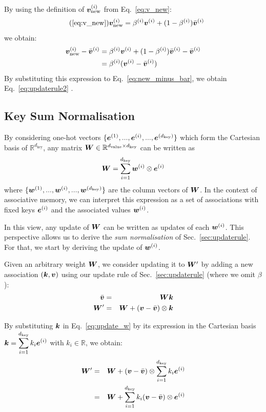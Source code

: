 \documentclass{article}
\theoremstyle{definition}
\begin{document}
By using the definition of ${\bm{v}}^{(i)}_\text{new}$ from Eq.~\ref{eq:v_new}:
\begin{align}
\tag{\ref{eq:v_new}}
\vv^{(i)}_\text{new} &= \beta^{(i)} \vv^{(i)} +(1-\beta^{(i)}) \bar{\vv}^{(i)}
\end{align}
we obtain:
\begin{align}
{\bm{v}}^{(i)}_\text{new} - \bar{{\bm{v}}}^{(i)} &= \beta^{(i)} {\bm{v}}^{(i)} +(1-\beta^{(i)}) \bar{{\bm{v}}}^{(i)} - \bar{{\bm{v}}}^{(i)} \\
 & =  \beta^{(i)} ({\bm{v}}^{(i)} - \bar{{\bm{v}}}^{(i)} )
\end{align}
By substituting this expression to Eq.~\ref{eq:new_minus_bar}, we obtain Eq.~\ref{eq:updaterule2} \qedsymbol.

\subsection{Key Sum Normalisation}
\label{app:norm}

By considering one-hot vectors $\{{\bm{e}}^{(1)}, ..., {\bm{e}}^{(i)}, ..., {\bm{e}}^{(d_\text{key})}\}$
which form the Cartesian basis of $\mathbb{R}^{d_\text{key}}$,
any matrix ${\bm{W}} \in \mathbb{R}^{d_\text{value} \times d_\text{key}}$ can be written as
\begin{eqnarray}
{\bm{W}} = \displaystyle \sum_{i=1}^{d_\text{key}} {\bm{w}}^{(i)}\otimes {\bm{e}}^{(i)} \label{eq:w_basis}
\end{eqnarray}
where $\{{\bm{w}}^{(1)}, ..., {\bm{w}}^{(i)}, ..., {\bm{w}}^{(d_\text{key})}\}$ are the column vectors of ${\bm{W}}$.
In the context of associative memory, we can interpret this expression as a set of associations with fixed keys ${\bm{e}}^{(i)}$ and the associated values ${\bm{w}}^{(i)}$.

In this view, any update of ${\bm{W}}$ can be written as updates of each ${\bm{w}}^{(i)}$.
This perspective allows us to derive the \textit{sum normalisation} of Sec.~\ref{sec:updaterule}.
For that, we start by deriving the update of ${\bm{w}}^{(i)}$. 

Given an arbitrary weight ${\bm{W}}$, we consider updating it to ${\bm{W}}'$ by adding a
new association $({\bm{k}}, {\bm{v}})$ using our update rule of Sec.~\ref{sec:updaterule} (where we omit
$\beta$):
\begin{eqnarray}
\bar{{\bm{v}}} &=& {\bm{W}} {\bm{k}} \\
{\bm{W}}' &=& {\bm{W}} + ({\bm{v}} - \bar{{\bm{v}}}) \otimes {\bm{k}} \label{eq:update_w}
\end{eqnarray}

By substituting ${\bm{k}}$ in Eq.~\ref{eq:update_w} by its expression in the Cartesian basis $\displaystyle {\bm{k}} = \sum_{i=1}^{d_\text{key}} k_i {\bm{e}}^{(i)}$ with $k_i \in \mathbb{R}$, we obtain:
\begin{eqnarray}
{\bm{W}}' &=& {\bm{W}} + ({\bm{v}} - \bar{{\bm{v}}})  \otimes \sum_{i=1}^{d_\text{key}} k_i {\bm{e}}^{(i)} \\
&=& {\bm{W}} + \sum_{i=1}^{d_\text{key}} k_i ({\bm{v}} - \bar{{\bm{v}}})  \otimes {\bm{e}}^{(i)} 
\end{eqnarray}
\end{document}

